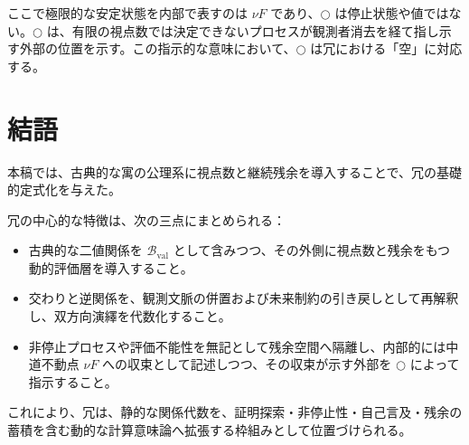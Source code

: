 \documentclass[a4paper,11pt]{article}
\newcommand{\dfix}{\bigcirc}
\theoremstyle{definition}
\begin{document}
ここで極限的な安定状態を内部で表すのは $\nu F$ であり、$\dfix$ は停止状態や値ではない。$\dfix$ は、有限の視点数では決定できないプロセスが観測者消去を経て指し示す外部の位置を示す。この指示的な意味において、$\dfix$ は冗における「空」に対応する。

\section{結語}
本稿では、古典的な寓の公理系に視点数と継続残余を導入することで、冗の基礎的定式化を与えた。

冗の中心的な特徴は、次の三点にまとめられる：
\begin{itemize}
\item 古典的な二値関係を $\mathcal{B}_{\mathrm{val}}$ として含みつつ、その外側に視点数と残余をもつ動的評価層を導入すること。
\item 交わりと逆関係を、観測文脈の併置および未来制約の引き戻しとして再解釈し、双方向演繹を代数化すること。
\item 非停止プロセスや評価不能性を無記として残余空間へ隔離し、内部的には中道不動点 $\nu F$ への収束として記述しつつ、その収束が示す外部を $\dfix$ によって指示すること。
\end{itemize}

これにより、冗は、静的な関係代数を、証明探索・非停止性・自己言及・残余の蓄積を含む動的な計算意味論へ拡張する枠組みとして位置づけられる。



\end{document}
